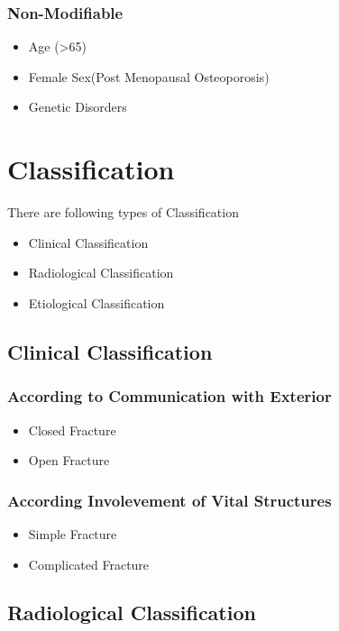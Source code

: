 \documentclass[11pt, a4paper]{article}
\begin{document}
\subsubsection{Non-Modifiable}
\begin{itemize}
    \item Age (>65)
    \item Female Sex(Post Menopausal Osteoporosis)
    \item Genetic Disorders
\end{itemize}

\section{Classification}
There are following types of Classification
\begin{itemize}
    \item Clinical Classification
    \item Radiological Classification
    \item Etiological Classification
\end{itemize}
\subsection{Clinical Classification}
\subsubsection{According to Communication with Exterior}
\begin{itemize}
    \item Closed Fracture
    \item Open Fracture
\end{itemize}
\subsubsection{According Involevement of Vital Structures}
\begin{itemize}
    \item Simple Fracture
    \item Complicated Fracture
\end{itemize}

\subsection{Radiological Classification}
\end{document}
